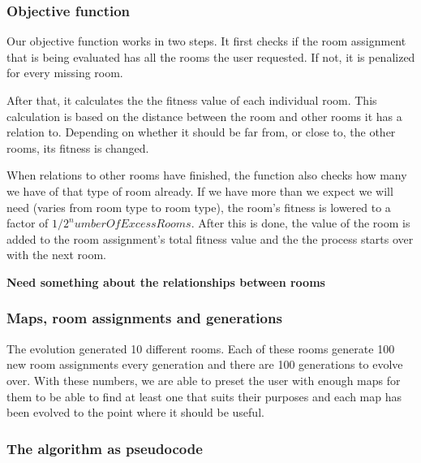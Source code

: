 \subsubsection{Objective function}

Our objective function works in two steps. It first checks if the room assignment that is being evaluated has all the rooms the user requested. If not, it is penalized for every missing room.

After that, it calculates the the fitness value of each individual room. This calculation is based on the distance between the room and other rooms it has a relation to. Depending on whether it should be far from, or close to, the other rooms, its fitness is changed. 

When relations to other rooms have finished, the function also checks how many we have of that type of room already. If we have more than we expect we will need (varies from room type to room type), the room's fitness is lowered to a factor of $1 / 2^numberOfExcessRooms$. After this is done, the value of the room is added to the room assignment's total fitness value and the the process starts over with the next room.

\textbf{Need something about the relationships between rooms}

\subsubsection{Maps, room assignments and generations}

The evolution generated 10 different rooms. Each of these rooms generate 100 new room assignments every generation and there are 100 generations to evolve over. With these numbers, we are able to preset the user with enough maps for them to be able to find at least one that suits their purposes and each map has been evolved to the point where it should be useful.

\subsubsection{The algorithm as pseudocode}

